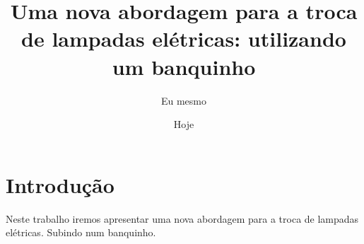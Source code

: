 \documentclass{article}
\author{Eu mesmo}
\date{Hoje}
\title{Uma nova abordagem para a troca de
       lampadas elétricas: utilizando um banquinho}
\begin{document}
\maketitle

\newpage

\section{Introdução}

Neste trabalho  iremos apresentar uma nova abordagem
para a troca  de lampadas elétricas.
Subindo  num  banquinho. %

\end{document}
